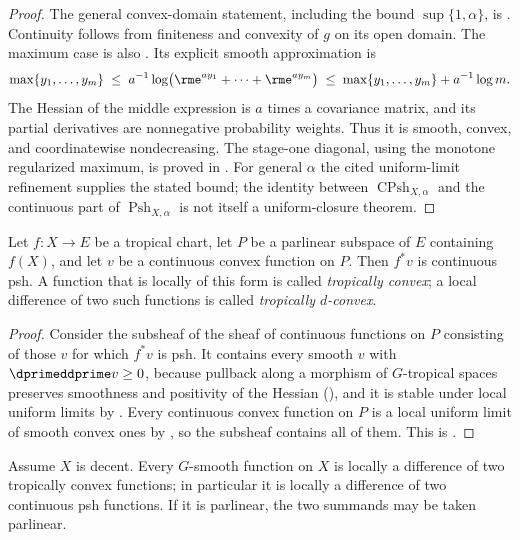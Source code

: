 \begin{proof}
The general convex-domain statement, including the bound
$\sup\{1,\alpha\}$, is \cite[Corollaries~8.2.2--8.2.4]{CLD25}.
Continuity follows from finiteness and convexity of $g$ on its open domain.
The maximum case is also .  Its explicit
smooth approximation is
\begin{equation}
\label{eq:ch16-softmax}
 \max\{y_1,\ldots,y_m\}
 \;\leq\;
 a^{-1}\log\bigl(\rme^{ay_1}+\cdots+\rme^{ay_m}\bigr)
 \;\leq\;
 \max\{y_1,\ldots,y_m\}+a^{-1}\log m .
\end{equation}
The Hessian of the middle expression is $a$ times a covariance matrix,
and its partial derivatives are nonnegative probability weights.  Thus it
is smooth, convex, and coordinatewise nondecreasing.  The stage-one
diagonal, using the monotone regularized maximum, is proved in
.  For general $\alpha$ the cited
uniform-limit refinement supplies the stated bound; the identity between
$\operatorname{CPsh}_{X,\alpha}$ and the continuous part of
$\operatorname{Psh}_{X,\alpha}$ is not itself a uniform-closure theorem.
\end{proof}

\begin{proposition}
\label{prop:ch16-tropically-convex}
Let $f:X\to E$ be a tropical chart, let $P$ be a parlinear subspace of $E$
containing $f(X)$, and let $v$ be a continuous convex function on $P$.  Then
$f^*v$ is continuous psh.  A function that is locally of this form is called
\emph{tropically convex}; a local difference of two such functions is called
\emph{tropically $d$-convex}.
\end{proposition}

\begin{proof}
Consider the subsheaf of the sheaf of continuous functions on $P$ consisting
of those $v$ for which $f^*v$ is psh.  It contains every smooth $v$ with
$\dprimeddprime v\geq0$, because pullback along a morphism of $G$-tropical
spaces preserves smoothness and positivity of the Hessian
(), and it is stable under local uniform limits by
.  Every
continuous convex function on $P$ is a local uniform limit of smooth convex
ones by , so the subsheaf
contains all of them.  This is \cite[Propositions~8.2.5
and~8.2.6]{CLD25}.
\end{proof}

\begin{proposition}
\label{prop:ch16-dpsh-smooth}
Assume $X$ is decent.  Every $G$-smooth function on $X$ is locally a
difference of two tropically
convex functions; in particular it is locally a difference of two continuous
psh functions.  If it is parlinear, the two summands may be taken
parlinear.
\end{proposition}

